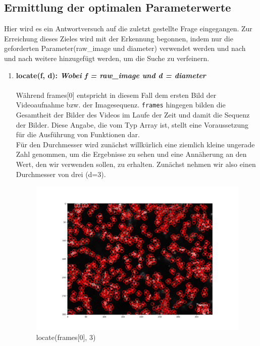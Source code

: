 	\subsection{Ermittlung der optimalen Parameterwerte \label{kap3_OP}}
	Hier wird es ein Antwortversuch auf die zuletzt gestellte Frage eingegangen. Zur Erreichung dieses Zieles wird mit der Erkennung begonnen, indem nur die geforderten Parameter(raw\_image und diameter) verwendet werden und nach und nach weitere hinzugefügt werden, um die Suche zu verfeinern. 
	
	\begin{enumerate}
    			\item \textbf{locate(f, d): \textit{Wobei f = raw\_image und d = diameter}} \\ \\
    			 Während frames[0] entspricht in diesem Fall dem ersten Bild der Videoaufnahme bzw. der Imagesequenz. \texttt{frames} hingegen bilden die Gesamtheit der Bilder des Videos im Laufe der Zeit und damit die Sequenz der Bilder.  Diese Angabe, die vom Typ Array ist, stellt eine Voraussetzung für die Ausführung von Funktionen dar. \\
    			 Für den Durchmesser wird zunächst willkürlich eine ziemlich kleine ungerade Zahl genommen, um die Ergebnisse zu sehen und eine Annäherung an den Wert, den wir verwenden sollen, zu erhalten. Zunächst nehmen wir also einen Durchmesser von drei (d=3).  
    			 
\begin{figure}[H]
    \centering
    \includegraphics[scale=0.35]{Grafiken/trackpyBilder/locate(f0, diameter=3).png}
    \caption{locate(frames[0], 3)}
    \label{fig:bild_label}
\end{figure} 


\end{enumerate}
